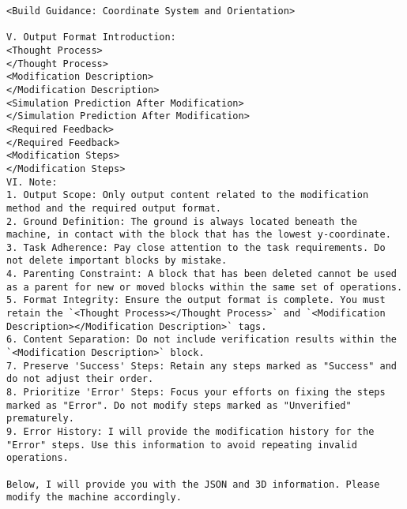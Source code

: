 \begin{lstlisting}
<Build Guidance: Coordinate System and Orientation>

V. Output Format Introduction:
<Thought Process>
</Thought Process>
<Modification Description>
</Modification Description>
<Simulation Prediction After Modification>
</Simulation Prediction After Modification>
<Required Feedback>
</Required Feedback>
<Modification Steps>
</Modification Steps>
VI. Note:
1. Output Scope: Only output content related to the modification method and the required output format.
2. Ground Definition: The ground is always located beneath the machine, in contact with the block that has the lowest y-coordinate.
3. Task Adherence: Pay close attention to the task requirements. Do not delete important blocks by mistake.
4. Parenting Constraint: A block that has been deleted cannot be used as a parent for new or moved blocks within the same set of operations.
5. Format Integrity: Ensure the output format is complete. You must retain the `<Thought Process></Thought Process>` and `<Modification Description></Modification Description>` tags.
6. Content Separation: Do not include verification results within the `<Modification Description>` block.
7. Preserve 'Success' Steps: Retain any steps marked as "Success" and do not adjust their order.
8. Prioritize 'Error' Steps: Focus your efforts on fixing the steps marked as "Error". Do not modify steps marked as "Unverified" prematurely.
9. Error History: I will provide the modification history for the "Error" steps. Use this information to avoid repeating invalid operations.

Below, I will provide you with the JSON and 3D information. Please modify the machine accordingly.
\end{lstlisting}

